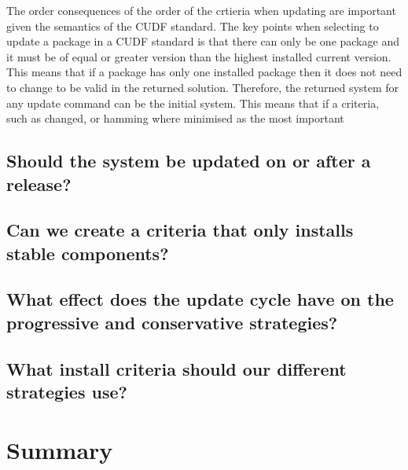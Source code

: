 The order consequences of the order of the crtieria when updating are important given the semantics of the CUDF standard.
The key points when selecting to update a package in a CUDF standard is that there can only be one package and it must be of equal or greater version than the highest installed current version.
This means that if a package has only one installed package then it does not need to change to be valid in the returned solution.
Therefore, the returned system for any update command can be the initial system.
This means that if a criteria, such as changed, or hamming where minimised as the most important  


\subsection{Should the system be updated on or after a release?}

\subsection{Can we create a criteria that only installs stable components?}

\subsection{What effect does the update cycle have on the progressive and conservative strategies?}

\subsection{What install criteria should our different strategies use?}


\section{Summary}
